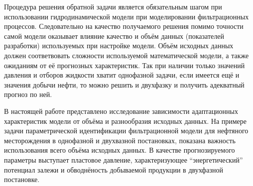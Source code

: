 \documentclass{article}
\begin{document}
	Процедура решения обратной задачи является обязательным шагом при использовании гидродинамической модели при моделировании фильтрационных процессов. Следовательно на качество получаемого решения помимо точности самой модели оказывает влияние качество и объём данных (показателей разработки) используемых при настройке модели. Объём исходных данных должен соответвовать сложности используемой математической модели, а также ожиданиям от её прогнозных характеристик. Так при наличии только значений давления и отборов жидкости хватит однофазной задачи, если имеется ещё и значения добычи нефти, то можно решить и двухфазку и получить адекватный прогноз по ней.
	
	В настоящей работе представлено исследование зависимости адаптационных характеристик модели от объёма и разнообразия исходных данных. На примере задачи параметрической идентификации фильтрационной модели для нефтяного месторождения в однофазной и двухвазной постановках, показана важность использования всего объёма исходных данных. В качестве прогнозируемого параметры выступает пластовое давление, характеризующее “энергетический” потенциал залежи и обводнёность добываемой продукции в двухфазной постановке.
\end{document}
